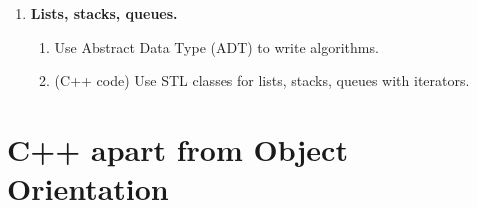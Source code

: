 \documentclass[a4paper,12pt]{article}
\begin{document}
{\begin{enumerate}
\begin{enumerate}[label=3.\Alph*.]
\item Find the asymptotic growth for a given function.
\item Compare classes of function growth or order them.
\item Express time complexity for recursively defined functions. 
\item Express time complexity for a code snippet ``from the inside out''. 
\item Find the amortized time complexity for an operation on a given data structure.
\item Count the number of calls for comparisons or similar functions.
\end{enumerate}
\item \textbf{Lists, stacks, queues.} 
\begin{enumerate}[label=4.\Alph*.]
\item Use Abstract Data Type (ADT) to write algorithms.
\item (C++ code) Use STL classes for lists, stacks, queues with iterators.
\end{enumerate}
\end{enumerate}
}


\clearpage

\section{C++ apart from Object Orientation}
\end{document}

